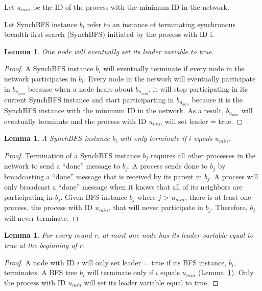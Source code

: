 \documentclass[english]{article}
\newtheorem{lemma}[theorem]{Lemma}
\begin{document}
\begin{definition}
Let $u_{min}$ be the ID of the process with the minimum ID in the network. 
\end{definition}

\begin{definition}
Let SynchBFS instance $b_i$ refer to an instance of terminating synchronous breadth-first search (SynchBFS) initiated by the process with ID i.
\end{definition}

\begin{lemma}
\label{LELivenessStatic}
  One node will eventually set its leader variable to true.
\end{lemma}
\begin{proof}
A SynchBFS instance $b_i$ will eventually terminate if every node in the network participates in $b_i$. 
Every node in the network will eventually participate in $b_{u_{min}}$ because when a node hears about $b_{u_{min}}$, it will stop participating in its current SynchBFS instance and start participarting in $b_{u_{min}}$ because it is the SynchBFS instance with the minimum ID in the network. As a result, $b_{u_{min}}$ will eventually terminate and the process with ID $u_{min}$ will set leader = true.
\end{proof}

\begin{lemma}
\label{BFSTermination}
  A SynchBFS instance $b_i$ will only terminate if $i$ equals $u_{min}$.
\end{lemma}
\begin{proof}
Termination of a SynchBFS instance $b_j$ requires all other processes in the network to send a ``done'' message to $b_j$. A process sends done to $b_j$ by broadcasting a ``done'' message that is received by its parent in $b_j$. A process will only broadcast a ``done'' message when it knows that all of its neighbors are participating in $b_j$.
Given BFS instance $b_j$ where $j$ \textgreater $ $ $u_{min}$, there is at least one process, the process with ID $u_{min}$, that will never participate in $b_j$.
Therefore, $b_j$ will never terminate.
\end{proof}


\begin{lemma}
\label{LESafetyStatic}
For every round $r$, at most one node has its leader variable equal to true at the beginning of $r$.
\end{lemma}
\begin{proof}
A node with ID $i$ will only set leader = true if its BFS instance, $b_i$, terminates.
A BFS tree $b_i$ will terminate only if $i$ equals $u_{min}$ (Lemma~\ref{BFSTermination}).
Only the process with ID $u_{min}$ will set its leader variable equal to true. 
\end{proof}
\end{document}
